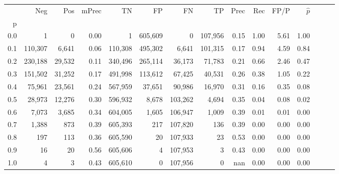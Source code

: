\begin{tabular}{rrrrrrrrrrrrrrr}
\toprule
{} &      Neg &     Pos & mPrec &       TN &       FP &       FN &       TP &  Prec &   Rec &  FP/P & $\hat{p}$ \\
p   &          &         &       &          &          &          &          &       &       &       &           \\
\midrule
0.0 &        1 &       0 &  0.00 &        1 &  605,609 &        0 &  107,956 &  0.15 &  1.00 &  5.61 &      1.00 \\
0.1 &  110,307 &   6,641 &  0.06 &  110,308 &  495,302 &    6,641 &  101,315 &  0.17 &  0.94 &  4.59 &      0.84 \\
0.2 &  230,188 &  29,532 &  0.11 &  340,496 &  265,114 &   36,173 &   71,783 &  0.21 &  0.66 &  2.46 &      0.47 \\
0.3 &  151,502 &  31,252 &  0.17 &  491,998 &  113,612 &   67,425 &   40,531 &  0.26 &  0.38 &  1.05 &      0.22 \\
0.4 &   75,961 &  23,561 &  0.24 &  567,959 &   37,651 &   90,986 &   16,970 &  0.31 &  0.16 &  0.35 &      0.08 \\
0.5 &   28,973 &  12,276 &  0.30 &  596,932 &    8,678 &  103,262 &    4,694 &  0.35 &  0.04 &  0.08 &      0.02 \\
0.6 &    7,073 &   3,685 &  0.34 &  604,005 &    1,605 &  106,947 &    1,009 &  0.39 &  0.01 &  0.01 &      0.00 \\
0.7 &    1,388 &     873 &  0.39 &  605,393 &      217 &  107,820 &      136 &  0.39 &  0.00 &  0.00 &      0.00 \\
0.8 &      197 &     113 &  0.36 &  605,590 &       20 &  107,933 &       23 &  0.53 &  0.00 &  0.00 &      0.00 \\
0.9 &       16 &      20 &  0.56 &  605,606 &        4 &  107,953 &        3 &  0.43 &  0.00 &  0.00 &      0.00 \\
1.0 &        4 &       3 &  0.43 &  605,610 &        0 &  107,956 &        0 &   nan &  0.00 &  0.00 &      0.00 \\
\bottomrule
\end{tabular}
